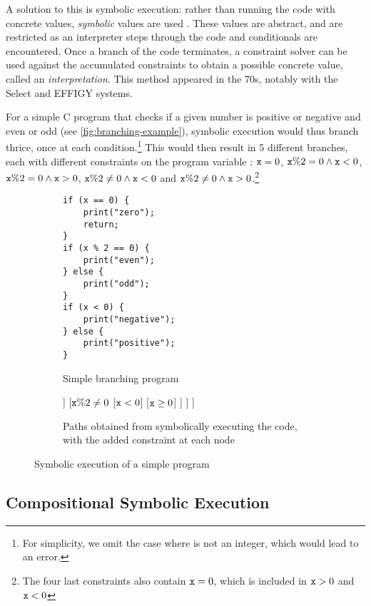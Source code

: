 A solution to this is symbolic execution: rather than running the code with concrete values, \emph{symbolic} values are used \cite{surveysymex}. These values are abstract, and are  restricted as an interpreter steps through the code and conditionals are encountered. Once a branch of the code terminates, a constraint solver can be used against the accumulated constraints to obtain a possible concrete value, called an \emph{interpretation}. This method appeared in the 70s, notably with the Select \cite{select-system} and EFFIGY \cite{effigy-system} systems.

For a simple C program that checks if a given number is positive or negative and even or odd (see \autoref{fig:branching-example}), symbolic execution would thus branch thrice, once at each condition.\footnote{For simplicity, we omit the case where  is not an integer, which would lead to an error.} This would then result in 5 different branches, each with different constraints on the program variable : $\code{x} = 0$, $\texttt{x}\%2=0 \land \texttt{x}<0$, $\texttt{x}\%2=0 \land \texttt{x}>0$, $\texttt{x}\%2\neq0 \land \texttt{x}<0$ and $\texttt{x}\%2\neq0 \land \texttt{x}>0$.\footnote{The four last constraints also contain $\code{x} = 0$, which is included in $\texttt{x}>0$ and $\code{x}<0$}

\begin{figure}[h]
\centering
\begin{subfigure}{.5\textwidth}
	\centering
	\begin{lstlisting}
if (x == 0) {
	print("zero");
	return;
}
if (x % 2 == 0) {
	print("even");
} else {
	print("odd");
}
if (x < 0) {
	print("negative");
} else {
	print("positive");
}
	\end{lstlisting}
	\caption{Simple branching program}
\end{subfigure}%
\begin{subfigure}{.5\textwidth}
\centering
\begin{forest}
[{$\top$}
	[{$\code{x} = 0$}]
	[{$\code{x}\neq 0$}
		[{$\code{x}\%2=0$}
			[{$\code{x} < 0$}]
			[{$\code{x} \geq 0$}]
		]
		[{$\texttt{x}\%2\neq0$}
			[{$\code{x} < 0$}]
			[{$\code{x} \geq 0$}]
		]
	]
]
\end{forest}
\caption{Paths obtained from symbolically executing the code, with the added constraint at each node}
\end{subfigure}
\caption{Symbolic execution of a simple program}
	\label{fig:branching-example}
\end{figure}
\subsection{Compositional Symbolic Execution}

